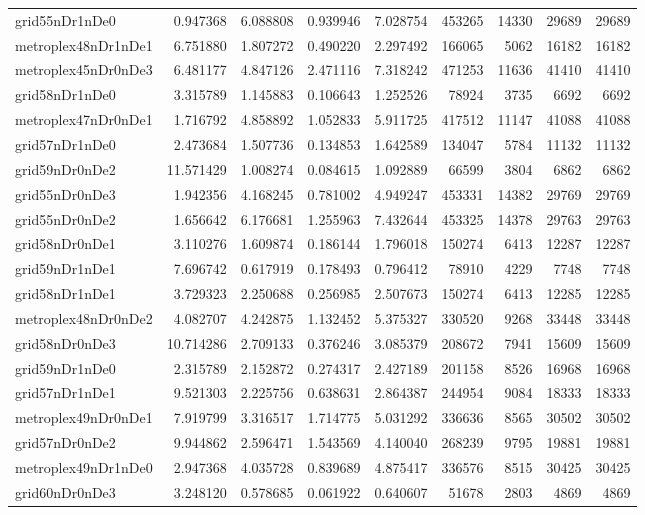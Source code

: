 \begin{longtable}{|l|r|r|r|r|r|r|r|r|}
grid55nDr1nDe0 & 0.947368 & 6.088808 & 0.939946 & 7.028754 & 453265 & 14330 & 29689 & 29689 \\
metroplex48nDr1nDe1 & 6.751880 & 1.807272 & 0.490220 & 2.297492 & 166065 & 5062 & 16182 & 16182 \\
metroplex45nDr0nDe3 & 6.481177 & 4.847126 & 2.471116 & 7.318242 & 471253 & 11636 & 41410 & 41410 \\
grid58nDr1nDe0 & 3.315789 & 1.145883 & 0.106643 & 1.252526 & 78924 & 3735 & 6692 & 6692 \\
metroplex47nDr0nDe1 & 1.716792 & 4.858892 & 1.052833 & 5.911725 & 417512 & 11147 & 41088 & 41088 \\
grid57nDr1nDe0 & 2.473684 & 1.507736 & 0.134853 & 1.642589 & 134047 & 5784 & 11132 & 11132 \\
grid59nDr0nDe2 & 11.571429 & 1.008274 & 0.084615 & 1.092889 & 66599 & 3804 & 6862 & 6862 \\
grid55nDr0nDe3 & 1.942356 & 4.168245 & 0.781002 & 4.949247 & 453331 & 14382 & 29769 & 29769 \\
grid55nDr0nDe2 & 1.656642 & 6.176681 & 1.255963 & 7.432644 & 453325 & 14378 & 29763 & 29763 \\
grid58nDr0nDe1 & 3.110276 & 1.609874 & 0.186144 & 1.796018 & 150274 & 6413 & 12287 & 12287 \\
grid59nDr1nDe1 & 7.696742 & 0.617919 & 0.178493 & 0.796412 & 78910 & 4229 & 7748 & 7748 \\
grid58nDr1nDe1 & 3.729323 & 2.250688 & 0.256985 & 2.507673 & 150274 & 6413 & 12285 & 12285 \\
metroplex48nDr0nDe2 & 4.082707 & 4.242875 & 1.132452 & 5.375327 & 330520 & 9268 & 33448 & 33448 \\
grid58nDr0nDe3 & 10.714286 & 2.709133 & 0.376246 & 3.085379 & 208672 & 7941 & 15609 & 15609 \\
grid59nDr1nDe0 & 2.315789 & 2.152872 & 0.274317 & 2.427189 & 201158 & 8526 & 16968 & 16968 \\
grid57nDr1nDe1 & 9.521303 & 2.225756 & 0.638631 & 2.864387 & 244954 & 9084 & 18333 & 18333 \\
metroplex49nDr0nDe1 & 7.919799 & 3.316517 & 1.714775 & 5.031292 & 336636 & 8565 & 30502 & 30502 \\
grid57nDr0nDe2 & 9.944862 & 2.596471 & 1.543569 & 4.140040 & 268239 & 9795 & 19881 & 19881 \\
metroplex49nDr1nDe0 & 2.947368 & 4.035728 & 0.839689 & 4.875417 & 336576 & 8515 & 30425 & 30425 \\
grid60nDr0nDe3 & 3.248120 & 0.578685 & 0.061922 & 0.640607 & 51678 & 2803 & 4869 & 4869 \\

\end{longtable}
